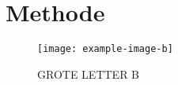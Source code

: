 \section{Methode}
\lipsum[7-8]

\begin{figure}[H]
    \centering
    \texttt{[image: example-image-b]}
    \caption[lettertje]{GROTE LETTER B}
\end{figure}

\lipsum[9]
